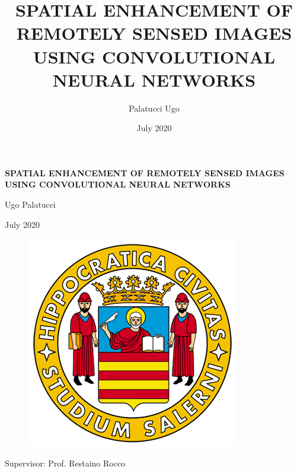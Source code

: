 \documentclass[12pt]{report}
\title{SPATIAL ENHANCEMENT OF REMOTELY SENSED IMAGES USING CONVOLUTIONAL NEURAL NETWORKS}
\author{Palatucci Ugo}
\date{July 2020}
\begin{document}

\begin{titlepage}
    \begin{center}
        \vspace*{1cm}
            
        \large
        \textbf{SPATIAL ENHANCEMENT OF REMOTELY SENSED IMAGES USING CONVOLUTIONAL NEURAL NETWORKS}
            
        \vspace{0.5cm}
            
        Ugo Palatucci
            
        \vspace{0.25cm}

        July 2020
            
        \vspace{0.8cm}
            
        \begin{figure}[!ht]
            \centering
            \includegraphics[scale=.5]{unisa.png}
        \end{figure}
            
    \end{center}
    Supervisor: \newline
    Prof. Restaino Rocco
    
\end{titlepage}

\restoregeometry

\tableofcontents
\end{document}
